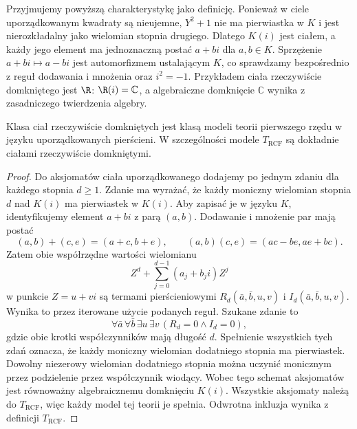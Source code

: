Przyjmujemy powyższą charakterystykę jako definicję.
Ponieważ w ciele uporządkowanym kwadraty są nieujemne,
$Y^2+1$ nie ma pierwiastka w $K$ i jest nierozkładalny
jako wielomian stopnia drugiego. Dlatego $K(i)$ jest
ciałem, a każdy jego element ma jednoznaczną postać
$a+bi$ dla $a,b\in K$. Sprzężenie $a+bi\mapsto a-bi$
jest automorfizmem ustalającym $K$, co sprawdzamy
bezpośrednio z reguł dodawania i mnożenia oraz $i^2=-1$.
Przykładem ciała rzeczywiście domkniętego jest $\R$:
$\R(i)=\mathbb C$, a algebraiczne domknięcie $\mathbb C$
wynika z zasadniczego twierdzenia algebry.

\begin{lemat}[Aksjomatyzowalność]
\label{lem:mod-qe-rcf-axioms}
Klasa ciał rzeczywiście domkniętych jest klasą modeli
teorii pierwszego rzędu w języku uporządkowanych pierścieni.
W szczególności modele $T_{\mathrm{RCF}}$ są dokładnie
ciałami rzeczywiście domkniętymi.
\end{lemat}
\begin{proof}
Do aksjomatów ciała uporządkowanego dodajemy po jednym
zdaniu dla każdego stopnia $d\geq1$. Zdanie ma wyrażać,
że każdy moniczny wielomian stopnia $d$ nad $K(i)$
ma pierwiastek w $K(i)$. Aby zapisać je w języku $K$,
identyfikujemy element $a+bi$ z parą $(a,b)$.
Dodawanie i mnożenie par mają postać
\[
(a,b)+(c,e)=(a+c,b+e),\qquad
(a,b)(c,e)=(ac-be,ae+bc).
\]
Zatem obie współrzędne wartości wielomianu
\[
Z^d+\sum_{j=0}^{d-1}(a_j+b_ji)Z^j
\]
w punkcie $Z=u+vi$ są termami pierścieniowymi
$R_d(\bar a,\bar b,u,v)$ i $I_d(\bar a,\bar b,u,v)$.
Wynika to przez iterowane użycie podanych reguł.
Szukane zdanie to
\[
\forall\bar a\,\forall\bar b\,\exists u\,\exists v\,
(R_d=0\land I_d=0),
\]
gdzie obie krotki współczynników mają długość $d$.
Spełnienie wszystkich tych zdań oznacza, że każdy
moniczny wielomian dodatniego stopnia ma pierwiastek.
Dowolny niezerowy wielomian dodatniego stopnia można
uczynić monicznym przez podzielenie przez współczynnik
wiodący. Wobec tego schemat aksjomatów jest równoważny
algebraicznemu domknięciu $K(i)$.
Wszystkie aksjomaty należą do $T_{\mathrm{RCF}}$,
więc każdy model tej teorii je spełnia. Odwrotna
inkluzja wynika z definicji $T_{\mathrm{RCF}}$.
\end{proof}

